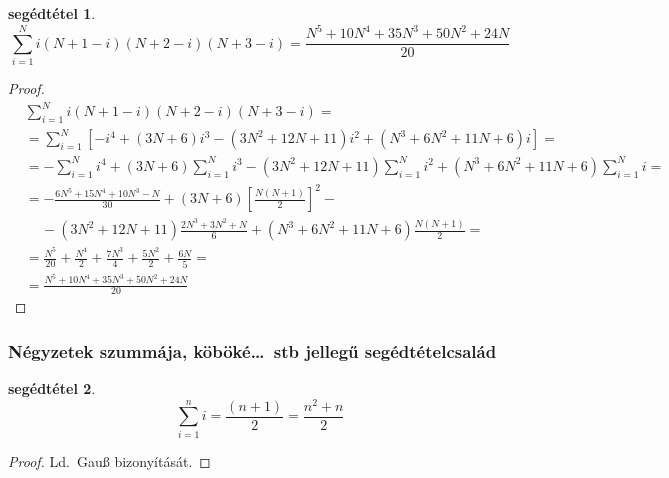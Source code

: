 \documentclass{article}
\newtheorem{lemm}{segédtétel}
\newcommand{\squareparenthesed}[1]{\left[#1\right]}
\newcommand{\parenthesed}[1]{\left(#1\right)}
\begin{document}
	\begin{lemm}
		\[
			\sum_{i=1}^N i\parenthesed{N+1-i}\parenthesed{N+2-i}\parenthesed{N+3-i} = \frac{N^5 + 10N^4 + 35N^3 +50N^2 + 24N}{20}
		\]
	\end{lemm}
	\begin{proof}
		\begin{align*}
			&\sum_{i=1}^N i\parenthesed{N+1-i}\parenthesed{N+2-i}\parenthesed{N+3-i} ={}\\
			&=  \sum_{i=1}^N\squareparenthesed{-i^4 + \parenthesed{3N+6}i^3 - \parenthesed{3N^2+12N+11}i^2 + \parenthesed{N^3+6N^2+11N+6}i}={}\\
			&= -\sum_{i=1}^N i^4 + \parenthesed{3N+6}\sum_{i=1}^N i^3 - \parenthesed{3N^2+12N+11}\sum_{i=1}^N i^2 + \parenthesed{N^3+6N^2+11N+6}\sum_{i=1}^Ni={}\\
			&= -\frac{6N^5+15N^4+10N^3-N}{30} + \parenthesed{3N+6}\squareparenthesed{\frac{N\parenthesed{N+1}}2}^2 - {}\\
			&\,\,\,\,\,\,\,- \parenthesed{3N^2+12N+11}\frac{2N^3+3N^2+N}6 + \parenthesed{N^3+6N^2+11N+6}\frac{N\parenthesed{N+1}}2 = {}\\
			&= \frac{N^5}{20} + \frac{N^4}2 + \frac{7N^3}4 + \frac{5N^2}2 + \frac{6N}5 = {}\\
			&= \frac{N^5 + 10N^4 + 35N^3 +50N^2 + 24N}{20}
		\end{align*}
	\end{proof}

	\subsubsection{Négyzetek szummája, köböké\dots\ stb jellegű segédtételcsalád}

	\begin{lemm}
		\[
			\sum_{i=1}^n i = \frac{\parenthesed{n+1}}2 = \frac{n^2+n}2
		\]
	\end{lemm}
	\begin{proof}
		Ld.~Gauß bizonyítását.
	\end{proof}
\end{document}

